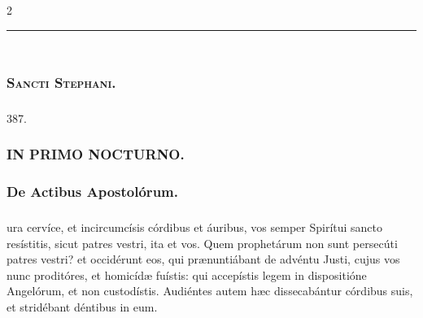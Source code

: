 \documentclass[9pt,twoside]{extarticle}
\begin{document}
\begin{multicols}{2}
\begin{tightlist}{}
\item {}
\end{tightlist}

\begin{center}\textcolor{red}{\rule{\linewidth}{0.5pt}} \end{center}

\subsection*{\center {}}
\subsubsection*{\center {}\\ \textsc{Sancti Stephani.}}
\subsubsection*{\center {}}

\begin{tightlist}{}
\item {} 387. 
\end{tightlist}

\subsubsection*{\center \textsc{IN PRIMO NOCTURNO.}}
\subsubsection*{\center De Actibus Apostolórum.}
\subsubsection*{\center {}}
ura cervíce, et incircumcísis córdibus et áuribus, vos semper Spirítui sancto resístitis, sicut patres vestri, ita et vos.
Quem prophetárum non sunt persecúti patres vestri? et occidérunt eos, qui prænuntiábant de advéntu Justi, cujus vos nunc proditóres, et homicídæ fuístis:
qui accepístis legem in dispositióne Angelórum, et non custodístis.
Audiéntes autem hæc dissecabántur córdibus suis, et stridébant déntibus in eum.


\end{multicols}
\end{document}
